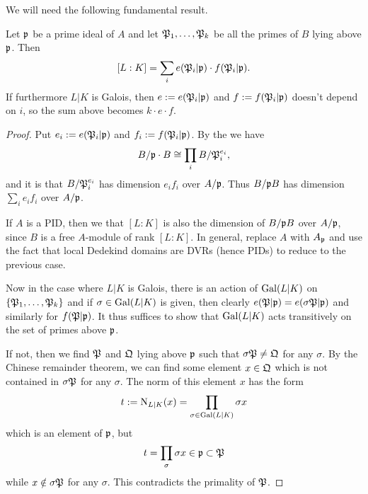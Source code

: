 We will need the following fundamental result.
\begin{lemma}\label{lemma:fundamental_equality}
  Let $\mathfrak{p}$ be a prime ideal of $A$ and let $\mathfrak{P}_{1},\ldots,\mathfrak{P}_{k}$ be all the primes of $B$ lying above $\mathfrak{p}$.
  Then
  \[ [L:K] = \sum_{i} e(\mathfrak{P}_{i}|\mathfrak{p}) \cdot f(\mathfrak{P}_{i}|\mathfrak{p}). \]
  If furthermore $L|K$ is Galois, then $e := e(\mathfrak{P}_{i}|\mathfrak{p})$ and $f := f(\mathfrak{P}_{i}|\mathfrak{p})$ doesn't depend on $i$, so the sum above becomes $k \cdot e \cdot f$.
\end{lemma}
\begin{proof}
  Put $e_{i} := e(\mathfrak{P}_{i}|\mathfrak{p})$ and $f_{i} := f(\mathfrak{P}_{i}|\mathfrak{p})$.
  By the  we have
  \[ B/\mathfrak{p} \cdot B \cong \prod_{i} B/\mathfrak{P}_{i}^{e_{i}}, \]
  and it is  that $B/\mathfrak{P}_{i}^{e_{i}}$ has dimension $e_{i} f_{i}$ over $A/\mathfrak{p}$.
  Thus $B/\mathfrak{p} B$ has dimension $\sum_{i} e_{i} f_{i}$ over $A/\mathfrak{p}$.

  If $A$ is a PID, then we  that $[L:K]$ is also the dimension of $B/\mathfrak{p} B$ over $A/\mathfrak{p}$, since $B$ is a free $A$-module of rank $[L:K]$.
  In general, replace $A$ with $A_{\mathfrak{p}}$ and use the fact that local Dedekind domains are DVRs (hence PIDs) to reduce to the previous case.

  Now in the case where $L|K$ is Galois, there is an action of $\operatorname{Gal}(L|K)$ on $\{\mathfrak{P}_{1},\ldots,\mathfrak{P}_{k}\}$ and if $\sigma \in \operatorname{Gal}(L|K)$ is given, then clearly $e(\mathfrak{P}|\mathfrak{p}) = e(\sigma\mathfrak{P}|\mathfrak{p})$ and similarly for $f(\mathfrak{P}|\mathfrak{p})$.
  It thus suffices to show that $\operatorname{Gal}(L|K)$ acts transitively on the set of primes above $\mathfrak{p}$.

  If not, then we find $\mathfrak{P}$ and $\mathfrak{Q}$ lying above $\mathfrak{p}$ such that $\sigma\mathfrak{P} \neq \mathfrak{Q}$ for any $\sigma$.
  By the Chinese remainder theorem, we can find some element $x \in \mathfrak{Q}$ which is not contained in $\sigma\mathfrak{P}$ for any $\sigma$.
  The norm of this element $x$ has the form
  \[ t := \operatorname{N}_{L|K}(x) = \prod_{\sigma \in \operatorname{Gal}(L|K)} \sigma x \]
  which is an element of $\mathfrak{p}$, but
  \[ t = \prod_{\sigma} \sigma x \in \mathfrak{p} \subset \mathfrak{P} \]
  while $x \notin \sigma \mathfrak{P}$ for any $\sigma$.
  This contradicts the primality of $\mathfrak{P}$.
\end{proof}

